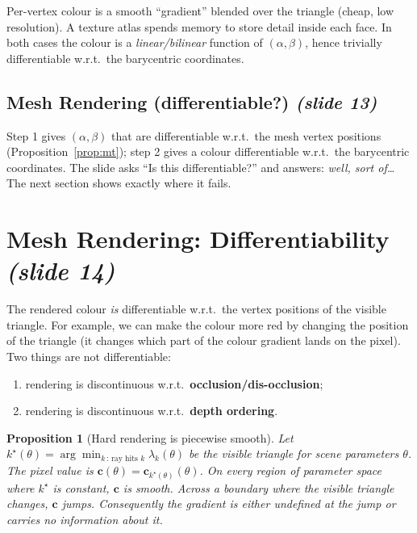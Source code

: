 \documentclass[11pt,a4paper]{article}
\newcommand{\sr}[1]{\texorpdfstring{\emph{(#1)}}{(#1)}}
\theoremstyle{definition}
\theoremstyle{algstyle}
\theoremstyle{plain}
\newtheorem{proposition}[definition]{Proposition}
\theoremstyle{remark}
\begin{document}
\begin{intuition}
Per-vertex colour is a smooth ``gradient'' blended over the triangle (cheap, low resolution). A texture atlas spends memory to store detail inside each face. In both cases the colour is a \emph{linear/bilinear} function of $(\alpha,\beta)$, hence trivially differentiable w.r.t.\ the barycentric coordinates.
\end{intuition}

\subsection{Mesh Rendering (differentiable?) \sr{slide 13}}
Step 1 gives $(\alpha,\beta)$ that are differentiable w.r.t.\ the mesh vertex positions (Proposition~\ref{prop:mt}); step 2 gives a colour differentiable w.r.t.\ the barycentric coordinates. The slide asks ``Is this differentiable?'' and answers: \emph{well, sort of\dots} The next section shows exactly where it fails.

\section{Mesh Rendering: Differentiability \sr{slide 14}}
The rendered colour \emph{is} differentiable w.r.t.\ the vertex positions of the visible triangle. For example, we can make the colour more red by changing the position of the triangle (it changes which part of the colour gradient lands on the pixel). Two things are not differentiable:
\begin{enumerate}[nosep]
\item rendering is discontinuous w.r.t.\ \textbf{occlusion/dis-occlusion};
\item rendering is discontinuous w.r.t.\ \textbf{depth ordering}.
\end{enumerate}

\begin{proposition}[Hard rendering is piecewise smooth]
Let $k^\star(\theta)=\arg\min_{k\,:\,\text{ray hits }k}\lambda_k(\theta)$ be the visible triangle for scene parameters $\theta$. The pixel value is $\bm c(\theta)=\bm c_{k^\star(\theta)}(\theta)$. On every region of parameter space where $k^\star$ is constant, $\bm c$ is smooth. Across a boundary where the visible triangle changes, $\bm c$ jumps. Consequently the gradient is either undefined at the jump or carries no information about it.
\end{proposition}
\end{document}
